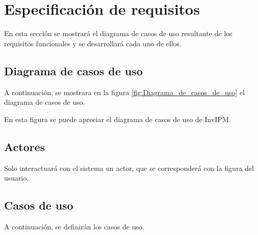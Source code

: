\section{Especificación de requisitos}\label{especificación-de-requisitos}

En esta sección se mostrará el diagrama de casos de uso resultante de los requisitos funcionales y se desarrollará cada uno de ellos.

\subsection{Diagrama de casos de uso}\label{diagrama-de-casos-de-uso}

A continuación, se mostrara en la figura \ref{fig:Diagrama_de_casos_de_uso} el diagrama de casos de uso.


En esta figura se puede apreciar el diagrama de casos de uso de InvIPM.

\subsection{Actores}\label{actores}

Solo interactuará con el sistema un actor, que se corresponderá con la figura del usuario.

\subsection{Casos de uso}\label{casos-de-uso}

A continuación, se definirán los casos de uso.

